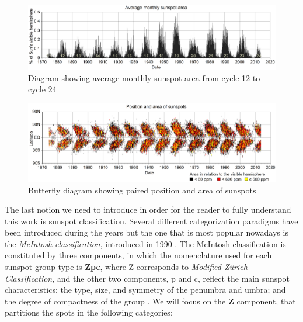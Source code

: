 \begin{figure}[t]
    \centering
    \includegraphics[width=\textwidth]{./pictures/ssarea}
    \caption{Diagram showing average monthly sunspot area from cycle 12 to cycle 24}
    \label{fig:ssarea}
\end{figure}
\begin{figure}[t]
    \centering
    \includegraphics[width=\textwidth]{./pictures/butterfly}
    \caption{Butterfly diagram showing paired position and area of sunspots}
    \label{fig:butterfly}
\end{figure}
The last notion we need to introduce in order for the reader to fully understand this work is sunspot classification. Several different categorization paradigms have been introduced during the years but the one that is most popular nowadays is the \textit{McIntosh classification}, introduced in 1990 \cite{mcintosh1990classification}. The McIntosh classification is constituted by three components, in which the nomenclature used for each sunspot group type is \textbf{Zpc}, where Z corresponds to \textit{Modified Z\"{u}rich Classification}, and the other two components, p and c, reflect the main sunspot characteristics: the type, size, and symmetry of the penumbra and umbra; and the degree of compactness of the group \cite{carrasco2015equivalence}. We will focus on the \textbf{Z} component, that partitions the spots in the following categories\cite{silso-class}:
